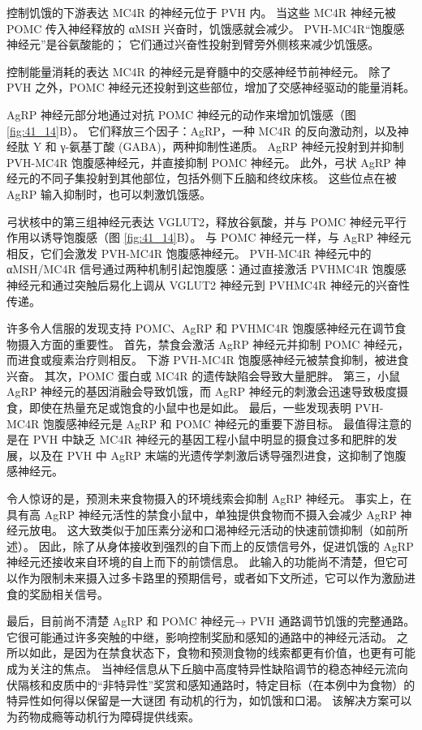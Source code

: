 控制饥饿的下游表达 MC4R 的神经元位于 PVH 内。 当这些 MC4R 神经元被 POMC 传入神经释放的 αMSH 兴奋时，饥饿感就会减少。 PVH-MC4R“饱腹感神经元”是谷氨酸能的； 它们通过兴奋性投射到臂旁外侧核来减少饥饿感。

控制能量消耗的表达 MC4R 的神经元是脊髓中的交感神经节前神经元。 除了 PVH 之外，POMC 神经元还投射到这些部位，增加了交感神经驱动的能量消耗。

AgRP 神经元部分地通过对抗 POMC 神经元的动作来增加饥饿感（图 \ref{fig:41_14}B）。 它们释放三个因子：AgRP，一种 MC4R 的反向激动剂，以及神经肽 Y 和 γ-氨基丁酸 (GABA)，两种抑制性递质。 AgRP 神经元投射到并抑制 PVH-MC4R 饱腹感神经元，并直接抑制 POMC 神经元。 此外，弓状 AgRP 神经元的不同子集投射到其他部位，包括外侧下丘脑和终纹床核。 这些位点在被 AgRP 输入抑制时，也可以刺激饥饿感。

弓状核中的第三组神经元表达 VGLUT2，释放谷氨酸，并与 POMC 神经元平行作用以诱导饱腹感（图 \ref{fig:41_14}B）。 与 POMC 神经元一样，与 AgRP 神经元相反，它们会激发 PVH-MC4R 饱腹感神经元。 PVH-MC4R 神经元中的 αMSH/MC4R 信号通过两种机制引起饱腹感：通过直接激活 PVHMC4R 饱腹感神经元和通过突触后易化上调从 VGLUT2 神经元到 PVHMC4R 神经元的兴奋性传递。

许多令人信服的发现支持 POMC、AgRP 和 PVHMC4R 饱腹感神经元在调节食物摄入方面的重要性。 首先，禁食会激活 AgRP 神经元并抑制 POMC 神经元，而进食或瘦素治疗则相反。 下游 PVH-MC4R 饱腹感神经元被禁食抑制，被进食兴奋。 其次，POMC 蛋白或 MC4R 的遗传缺陷会导致大量肥胖。 第三，小鼠 AgRP 神经元的基因消融会导致饥饿，而 AgRP 神经元的刺激会迅速导致极度摄食，即使在热量充足或饱食的小鼠中也是如此。 最后，一些发现表明 PVH-MC4R 饱腹感神经元是 AgRP 和 POMC 神经元的重要下游目标。 最值得注意的是在 PVH 中缺乏 MC4R 神经元的基因工程小鼠中明显的摄食过多和肥胖的发展，以及在 PVH 中 AgRP 末端的光遗传学刺激后诱导强烈进食，这抑制了饱腹感神经元。

令人惊讶的是，预测未来食物摄入的环境线索会抑制 AgRP 神经元。 事实上，在具有高 AgRP 神经元活性的禁食小鼠中，单独提供食物而不摄入会减少 AgRP 神经元放电。 这大致类似于加压素分泌和口渴神经元活动的快速前馈抑制（如前所述）。 因此，除了从身体接收到强烈的自下而上的反馈信号外，促进饥饿的 AgRP 神经元还接收来自环境的自上而下的前馈信息。 此输入的功能尚不清楚，但它可以作为限制未来摄入过多卡路里的预期信号，或者如下文所述，它可以作为激励进食的奖励相关信号。

最后，目前尚不清楚 AgRP 和 POMC 神经元→ PVH 通路调节饥饿的完整通路。 它很可能通过许多突触的中继，影响控制奖励和感知的通路中的神经元活动。 之所以如此，是因为在禁食状态下，食物和预测食物的线索都更有价值，也更有可能成为关注的焦点。 当神经信息从下丘脑中高度特异性缺陷调节的稳态神经元流向伏隔核和皮质中的“非特异性”奖赏和感知通路时，特定目标（在本例中为食物）的特异性如何得以保留是一大谜团 有动机的行为，如饥饿和口渴。 该解决方案可以为药物成瘾等动机行为障碍提供线索。

